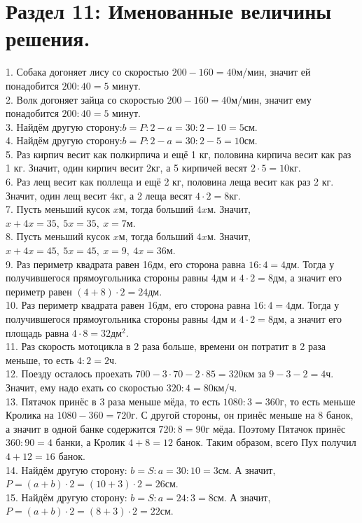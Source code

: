 \documentclass[12pt]{article}
\begin{document}
\section{Раздел 11: Именованные величины решения.}
1. Собака догоняет лису со скоростью $200-160=40$м/мин, значит ей понадобится $200:40=5$ минут.\\
2. Волк догоняет зайца со скоростью $200-160=40$м/мин, значит ему понадобится $200:40=5$ минут.\\
3. Найдём другую сторону:$b=P:2-a=30:2-10=5$см.\\
4. Найдём другую сторону:$b=P:2-a=30:2-5=10$см.\\
5. Раз кирпич весит как полкирпича и ещё 1 кг, половина кирпича весит как раз 1 кг. Значит, один кирпич весит 2кг, а 5 кирпичей весят $2\cdot5=10$кг.\\
6. Раз лещ весит как поллеща и ещё 2 кг, половина леща весит как раз 2 кг. Значит, один лещ весит 4кг, а 2 леща весят $4\cdot2=8$кг.\\
7. Пусть меньший кусок $x$м, тогда больший $4x$м. Значит, $x+4x=35,\ 5x=35,\ x=7$м.\\
8. Пусть меньший кусок $x$м, тогда больший $4x$м. Значит, $x+4x=45,\ 5x=45,\ x=9,\ 4x=36$м.\\
9. Раз периметр квадрата равен 16дм, его сторона равна $16:4=4$дм. Тогда у получившегося прямоугольника стороны равны 4дм и $4\cdot2=8$дм, а значит его периметр
равен $(4+8)\cdot2=24$дм.\\
10. Раз периметр квадрата равен 16дм, его сторона равна $16:4=4$дм. Тогда у получившегося прямоугольника стороны равны 4дм и $4\cdot2=8$дм, а значит его
площадь равна $4\cdot8=32\text{дм}^2.$\\
11. Раз скорость мотоцикла в 2 раза больше, времени он потратит в 2 раза меньше, то есть $4:2=2$ч.\\
12. Поезду осталось проехать $700-3\cdot70-2\cdot85=320$км за $9-3-2=4$ч. Значит, ему надо ехать со скоростью $320:4=80$км/ч.\\
13. Пятачок принёс в 3 раза меньше мёда, то есть $1080:3=360$г, то есть меньше Кролика на $1080-360=720$г. С другой стороны, он принёс меньше на 8 банок, а значит в одной банке содержится $720:8=90$г мёда. Поэтому Пятачок принёс $360:90=4$ банки, а Кролик $4+8=12$ банок. Таким образом, всего Пух получил $4+12=16$ банок.\\
14. Найдём другую сторону: $b=S:a=30:10=3$см. А значит, $P=(a+b)\cdot2=(10+3)\cdot2=26$см.\\
15. Найдём другую сторону: $b=S:a=24:3=8$см. А значит, $P=(a+b)\cdot2=(8+3)\cdot2=22$см.\\
\end{document}
